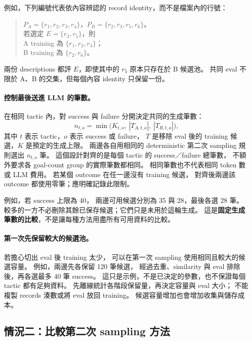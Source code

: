 例如，下列編號代表依內容辨認的 record identity，\allowbreak 而不是檔案內的行號：
\begin{quote}
$P_A=\{r_1,r_2,r_3,r_4\}$，$P_B=\{r_2,r_3,r_5,r_6\}$。\\
若選定 $E=\{r_3,r_5\}$，則\\
A training 為 $\{r_1,r_2,r_4\}$；\\
B training 為 $\{r_2,r_6\}$。
\end{quote}
兩份 descriptions 都評 $E$，\allowbreak 即使其中的 $r_5$ 原本只存在於 B 候選池。
共同 eval 不限於 A、B 的交集，\allowbreak 但每個內容 identity 只保留一份。

\paragraph{控制最後送進 LLM 的筆數。}
在相同 tactic 內，\allowbreak 對 success 與 failure 分開決定共同的生成筆數：
\[
  n_{t,o}=\min\bigl(K_{t,o},\ |T_{A,t,o}|,\ |T_{B,t,o}|\bigr),
\]
其中 $t$ 表示 tactic，\allowbreak $o$ 表示 success 或 failure，\allowbreak
$T$ 是移除 eval 後的 training 候選，\allowbreak $K$ 是預定的生成上限。
兩邊各自用相同的 deterministic 第二次 sampling 規則選出 $n_{t,o}$ 筆。
這個設計對齊的是每個 tactic 的 success／failure 總筆數，\allowbreak
不額外要求各 goal-count group 的實際筆數都相同。
相同筆數也不代表相同 token 數或 LLM 費用。
若某個 outcome 在任一邊沒有 training 候選，\allowbreak
對齊後兩邊該 outcome 都使用零筆；\allowbreak 應明確記錄此限制。

例如，若 success 上限為 40，\allowbreak
兩邊可用候選分別為 35 與 28，\allowbreak 最後各選 28 筆。
較多的一方不必刪除其餘已保存候選；\allowbreak 它們只是未用於這輪生成。
這是\textbf{固定生成筆數的比較}，\allowbreak 不是讓每種方法用盡所有可用資料的比較。

\paragraph{第一次先保留較大的候選池。}
若擔心切出 eval 後 training 太少，\allowbreak
可以在第一次 sampling 使用相同且較大的候選容量。
例如，兩邊先各保留 120 筆候選，\allowbreak
經過去重、similarity 與 eval 排除後，\allowbreak 再各選最多 40 筆 success。
這只是示例，\allowbreak 不是已決定的參數，也不保證每個 tactic 都有足夠資料。
先離線統計各階段保留量，\allowbreak 再決定容量與 eval 大小；\allowbreak
不能複製 records 湊數或將 eval 放回 training。
候選容量增加也會增加收集與儲存成本。

\subsection{情況二：比較第二次 sampling 方法}
\label{subsec:holdout-second-sampling}

